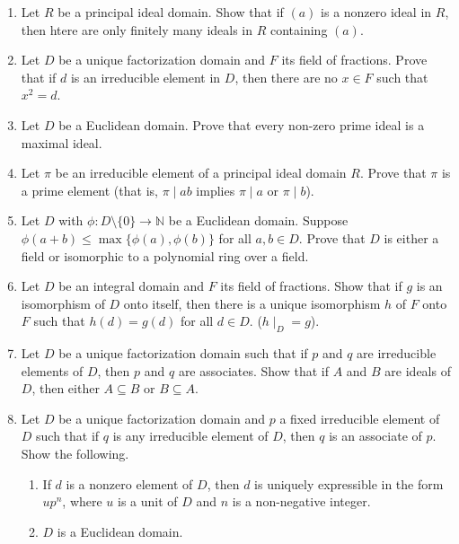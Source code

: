 \documentclass{article}
\theoremstyle{definition}
\newcommand{\N}{\mathbb{N}}
\begin{document}
\begin{enumerate}
            \item Let $R$ be a principal ideal domain. Show that if $(a)$ is a nonzero ideal in $R$, then htere are only finitely many ideals in $R$ containing $(a)$.
            
            \item Let $D$ be a unique factorization domain and $F$ its field of fractions. Prove that if $d$ is an irreducible element in $D$, then there are no $x\in F$ such that $x^2=d$.
            
            \item Let $D$ be a Euclidean domain. Prove that every non-zero prime ideal is a maximal ideal. 
            
            \item Let $\pi$ be an irreducible element of a principal ideal domain $R$. Prove that $\pi$ is a prime element (that is, $\pi \mid ab$ implies $\pi \mid a$ or $\pi \mid b$).
            
            \item Let $D$ with $\phi : D\setminus \{0\} \to \N$ be a Euclidean domain. Suppose $\phi(a+b) \leq \max \{\phi(a),\phi(b)\}$ for all $a,b\in D$. Prove that $D$ is either a field or isomorphic to a polynomial ring over a field.
            
            \item Let $D$ be an integral domain and $F$ its field of fractions. Show that if $g$ is an isomorphism of $D$ onto itself, then there is a unique isomorphism $h$ of $F$ onto $F$ such that $h(d)=g(d)$ for all $d\in D$. ($h\mid_D=g$).
            
            \item Let $D$ be a unique factorization domain such that if $p$ and $q$ are irreducible elements of $D$, then $p$ and $q$ are associates. Show that if $A$ and $B$ are ideals of $D$, then either $A\subseteq B$ or $B\subseteq A$.
            
            \item Let $D$ be a unique factorization domain and $p$ a fixed irreducible element of $D$ such that if $q$ is any irreducible element of $D$, then $q$ is an associate of $p$. Show the following.
            
            \begin{enumerate}
                \item If $d$ is a nonzero element of $D$, then $d$ is uniquely expressible in the form $up^n$, where $u$ is a unit of $D$ and $n$ is a non-negative integer.
                \item $D$ is a Euclidean domain.
            \end{enumerate}


\end{enumerate}
\end{document}
